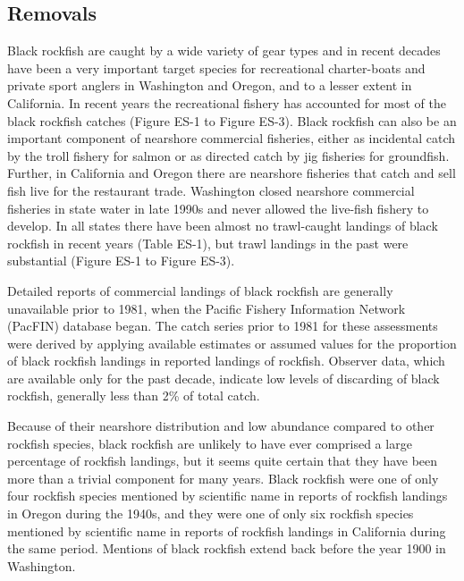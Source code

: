 \documentclass[11pt,
  english,
  letterpaper,
]{article}
\begin{document}
\hypertarget{removals}{%
\subsection*{Removals}\label{removals}}

Black rockfish are caught by a wide variety of gear types and in recent decades have been a very important target species for recreational charter-boats and private sport anglers in Washington and Oregon, and to a lesser extent in California. In recent years the recreational fishery has accounted for most of the black rockfish catches (Figure ES-1 to Figure ES-3). Black rockfish can also be an important component of nearshore commercial fisheries, either as incidental catch by the troll fishery for salmon or as directed catch by jig fisheries for groundfish. Further, in California and Oregon there are nearshore fisheries that catch and sell fish live for the restaurant trade. Washington closed nearshore commercial fisheries in state water in late 1990s and never allowed the live-fish fishery to develop. In all states there have been almost no trawl-caught landings of black rockfish in recent years (Table ES-1), but trawl landings in the past were substantial (Figure ES-1 to Figure ES-3).

Detailed reports of commercial landings of black rockfish are generally unavailable prior to 1981, when the Pacific Fishery Information Network (PacFIN) database began. The catch series prior to 1981 for these assessments were derived by applying available estimates or assumed values for the proportion of black rockfish landings in reported landings of rockfish. Observer data, which are available only for the past decade, indicate low levels of discarding of black rockfish, generally less than 2\% of total catch.

Because of their nearshore distribution and low abundance compared to other rockfish species, black rockfish are unlikely to have ever comprised a large percentage of rockfish landings, but it seems quite certain that they have been more than a trivial component for many years. Black rockfish were one of only four rockfish species mentioned by scientific name in reports of rockfish landings in Oregon during the 1940s, and they were one of only six rockfish species mentioned by scientific name in reports of rockfish landings in California during the same period. Mentions of black rockfish extend back before the year 1900 in Washington.

\clearpage
\end{document}
